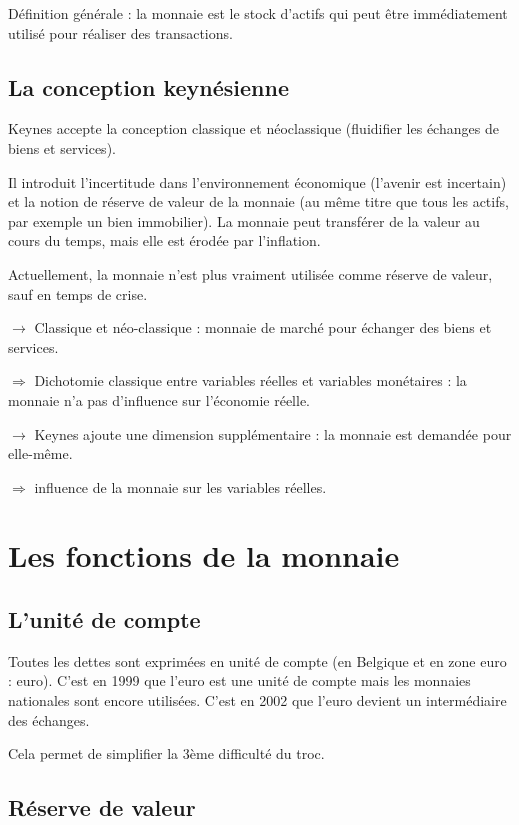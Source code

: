 	Définition générale : la monnaie est le stock d'actifs qui peut être immédiatement utilisé pour réaliser des transactions.
	
		
	\subsection{La conception keynésienne}
	
	Keynes accepte la conception classique et néoclassique (fluidifier les échanges de biens et services).
	
	Il introduit l'incertitude dans l'environnement économique (l'avenir est incertain) et la notion de réserve de valeur de la monnaie (au même titre que tous les actifs, par exemple un bien immobilier). La monnaie peut transférer de la valeur au cours du temps, mais elle est érodée par l'inflation.
	
		Actuellement, la monnaie n'est plus vraiment utilisée comme réserve de valeur, sauf en temps de crise.
	
	$\rightarrow$ Classique et néo-classique : monnaie de marché pour échanger des biens et services.
	
	$\Rightarrow$ Dichotomie classique entre variables réelles et variables monétaires : la monnaie n'a pas d'influence sur l'économie réelle.
	
	$\rightarrow$ Keynes ajoute une dimension supplémentaire : la monnaie est demandée pour elle-même.
	
	$\Rightarrow$ influence de la monnaie sur les variables réelles.
	

\section{Les fonctions de la monnaie}

	\subsection{L'unité de compte}
	
	Toutes les dettes sont exprimées en unité de compte (en Belgique et en zone euro : euro). C'est en 1999 que l'euro est une unité de compte mais les monnaies nationales sont encore utilisées. C'est en 2002 que l'euro devient un intermédiaire des échanges.
	
	Cela permet de simplifier la 3ème difficulté du troc.
	
	\subsection{Réserve de valeur}
	
